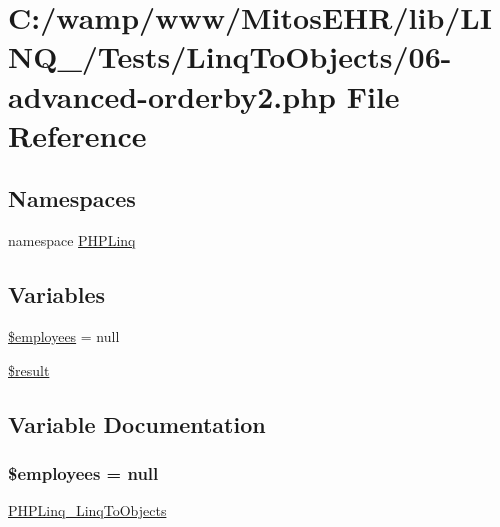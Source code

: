 \hypertarget{_linq_to_objects_206-advanced-orderby2_8php}{\section{\-C\-:/wamp/www/\-Mitos\-E\-H\-R/lib/\-L\-I\-N\-Q\-\_/\-Tests/\-Linq\-To\-Objects/06-\/advanced-\/orderby2.php \-File \-Reference}
\label{_linq_to_objects_206-advanced-orderby2_8php}
}
\subsection*{\-Namespaces}
\begin{DoxyCompactItemize}
\item 
namespace \hyperlink{namespace_p_h_p_linq}{\-P\-H\-P\-Linq}
\end{DoxyCompactItemize}
\subsection*{\-Variables}
\begin{DoxyCompactItemize}
\item 
\hyperlink{_linq_to_objects_206-advanced-orderby2_8php_a598c06abe9d65a9d2990e39693ce2c27}{\$employees} = null
\item 
\hyperlink{_linq_to_objects_206-advanced-orderby2_8php_a112ef069ddc0454086e3d1e6d8d55d07}{\$result}
\end{DoxyCompactItemize}


\subsection{\-Variable \-Documentation}
\hypertarget{_linq_to_objects_206-advanced-orderby2_8php_a598c06abe9d65a9d2990e39693ce2c27}{
\subsubsection[{\$employees}]{\setlength{\rightskip}{0pt plus 5cm}\$employees = null}}\label{_linq_to_objects_206-advanced-orderby2_8php_a598c06abe9d65a9d2990e39693ce2c27}
\hyperlink{class_p_h_p_linq___linq_to_objects}{\-P\-H\-P\-Linq\-\_\-\-Linq\-To\-Objects} 

